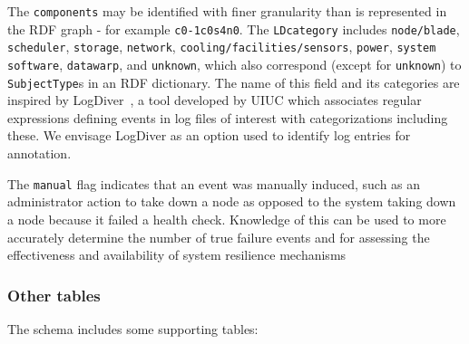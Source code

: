 The \texttt{components} may be identified with finer granularity than
is represented in the RDF graph - for example \texttt{c0-1c0s4n0}. The 
\texttt{LDcategory} includes \texttt{node/blade},
\texttt{scheduler}, \texttt{storage}, \texttt{network}, 
\texttt{cooling/facilities/sensors},
\texttt{power}, \texttt{system software}, \texttt{datawarp}, 
and \texttt{unknown}, which also correspond (except for \texttt{unknown}) to
 \texttt{SubjectType}s in an RDF dictionary. The name of this field and its 
 categories are inspired by LogDiver~\cite{LogDiver}, 
a tool developed by UIUC which associates regular expressions defining
events in log files of interest with categorizations including these. 
We envisage LogDiver as an option used to identify log entries for annotation.

The \texttt{manual} flag indicates that an event was manually induced,
such as an administrator action to take down a node as opposed
to the system taking down a node because it failed a health check.
Knowledge of this can be used to more accurately determine the
number of true failure events and for assessing the effectiveness
and availability of system resilience mechanisms




\subsubsection{Other tables}

The schema includes some supporting tables:

